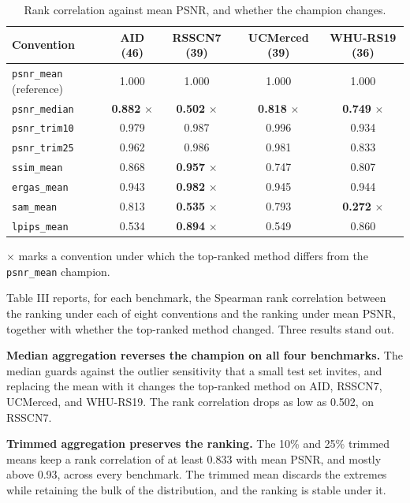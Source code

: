 \documentclass[journal,twoside,10pt]{IEEEtran}
\newlength{\tblavail}
\begin{document}
\begin{table}[!t]
\caption{Rank correlation against mean PSNR, and whether the champion changes.}
\label{tab:III}
\centering
\small
\setlength{\tabcolsep}{3pt}
\setlength{\tblavail}{\dimexpr\textwidth-10\tabcolsep\relax}
\begin{tabular}{lcccc}
\hline
Convention & AID (46) & RSSCN7 (39) & UCMerced (39) & WHU-RS19 (36) \\
\hline
\texttt{psnr\_mean} (reference) & 1.000 & 1.000 & 1.000 & 1.000 \\
\texttt{psnr\_median} & \textbf{0.882} $\times$ & \textbf{0.502} $\times$ & \textbf{0.818} $\times$ & \textbf{0.749} $\times$ \\
\texttt{psnr\_trim10} & 0.979 & 0.987 & 0.996 & 0.934 \\
\texttt{psnr\_trim25} & 0.962 & 0.986 & 0.981 & 0.833 \\
\texttt{ssim\_mean} & 0.868 & \textbf{0.957} $\times$ & 0.747 & 0.807 \\
\texttt{ergas\_mean} & 0.943 & \textbf{0.982} $\times$ & 0.945 & 0.944 \\
\texttt{sam\_mean} & 0.813 & \textbf{0.535} $\times$ & 0.793 & \textbf{0.272} $\times$ \\
\texttt{lpips\_mean} & 0.534 & \textbf{0.894} $\times$ & 0.549 & 0.860 \\
\hline
\end{tabular}
\end{table}

$\times$ marks a convention under which the top-ranked method differs from the \texttt{psnr\_mean} champion.

Table III reports, for each benchmark, the Spearman rank correlation between the ranking under each of eight conventions and the ranking under mean PSNR, together with whether the top-ranked method changed. Three results stand out.

\textbf{Median aggregation reverses the champion on all four benchmarks.} The median guards against the outlier sensitivity that a small test set invites, and replacing the mean with it changes the top-ranked method on AID, RSSCN7, UCMerced, and WHU-RS19. The rank correlation drops as low as 0.502, on RSSCN7.

\textbf{Trimmed aggregation preserves the ranking.} The 10\% and 25\% trimmed means keep a rank correlation of at least 0.833 with mean PSNR, and mostly above 0.93, across every benchmark. The trimmed mean discards the extremes while retaining the bulk of the distribution, and the ranking is stable under it.
\end{document}
